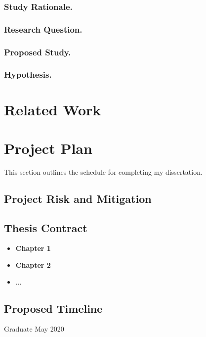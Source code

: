\documentclass[runningheads]{llncs}
\begin{document}

\subsubsection{Study Rationale.}

\subsubsection{Research Question.}

\subsubsection{Proposed Study.} 

\subsubsection{Hypothesis.} 

\section{Related Work}

\section{Project Plan}

This section outlines the schedule for completing my dissertation.

\subsection{Project Risk and Mitigation}

\subsection{Thesis Contract}

\begin{itemize}
  \item \textbf{Chapter 1}
  \item \textbf{Chapter 2}
  \item ...
\end{itemize}

\subsection{Proposed Timeline}
Graduate May 2020



%
%
%
% 
% 
%


\end{document}

